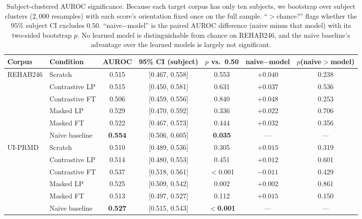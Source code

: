 \documentclass[10pt,journal]{IEEEtran}
\begin{document}
\begin{table}[t]
\centering
\footnotesize
\setlength{\tabcolsep}{4pt}
\caption{Subject-clustered AUROC significance. Because each target corpus has only ten subjects, we bootstrap over subject clusters ($2{,}000$ resamples) with each score's orientation fixed once on the full sample. ``$>$chance?'' flags whether the $95\%$ subject CI excludes $0.50$. ``naive$-$model'' is the paired AUROC difference (naive minus that model) with its two-sided bootstrap $p$. No learned model is distinguishable from chance on REHAB246, and the naive baseline's advantage over the learned models is largely not significant.}
\label{tab:auroc-sig}
\begin{tabular}{llccccc}
\toprule
Corpus & Condition & AUROC & 95\% CI (subject) & $p$ vs.\ 0.50 & naive$-$model & $p$(naive$>$model) \\
\midrule
\multirow{6}{*}{REHAB246}
 & Scratch        & 0.515 & [0.467, 0.558] & 0.553 & $+0.040$ & 0.238 \\
 & Contrastive LP & 0.515 & [0.450, 0.581] & 0.631 & $+0.037$ & 0.536 \\
 & Contrastive FT & 0.506 & [0.459, 0.556] & 0.840 & $+0.048$ & 0.253 \\
 & Masked LP      & 0.529 & [0.470, 0.592] & 0.336 & $+0.022$ & 0.706 \\
 & Masked FT      & 0.522 & [0.467, 0.573] & 0.444 & $+0.032$ & 0.356 \\
 & Naive baseline & \textbf{0.554} & [0.506, 0.605] & \textbf{0.035} & --- & --- \\
\midrule
\multirow{6}{*}{UI-PRMD}
 & Scratch        & 0.510 & [0.489, 0.536] & 0.305 & $+0.015$ & 0.319 \\
 & Contrastive LP & 0.514 & [0.480, 0.553] & 0.451 & $+0.012$ & 0.601 \\
 & Contrastive FT & 0.537 & [0.518, 0.561] & $<$0.001 & $-0.011$ & 0.429 \\
 & Masked LP      & 0.525 & [0.509, 0.542] & 0.002 & $+0.002$ & 0.861 \\
 & Masked FT      & 0.513 & [0.497, 0.527] & 0.112 & $+0.015$ & 0.150 \\
 & Naive baseline & \textbf{0.527} & [0.515, 0.543] & \textbf{$<$0.001} & --- & --- \\
\bottomrule
\end{tabular}
\end{table}
\end{document}
